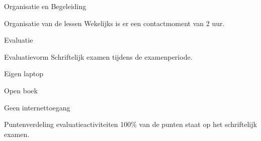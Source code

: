 \documentclass{studiewijzer}
\begin{document}
\showheader

\begin{categorybox}{Organisatie en Begeleiding}
    \begin{category}{Organisatie van de lessen}
        Wekelijks is er een contactmoment van 2 uur.
    \end{category}
\end{categorybox}

\begin{categorybox}{Evaluatie}
    \begin{category}{Evaluatievorm}
        Schriftelijk examen tijdens de examenperiode.
        \begin{items}
            \item Eigen laptop
            \item Open boek
            \item Geen internettoegang
        \end{items}
    \end{category}

    \begin{category}{Puntenverdeling evaluatieactiviteiten}
        100\% van de punten staat op het schriftelijk examen.
    \end{category}
\end{categorybox}
\end{document}
